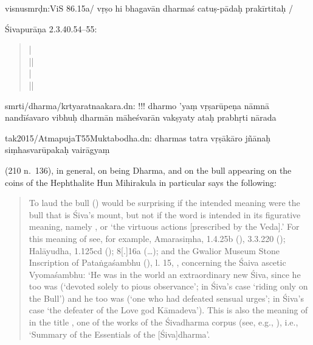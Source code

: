 \documentclass[11pt]{book}
\begin{document}
visnusmrḍn:ViS 86.15a/ vṛṣo hi bhagavān dharmaś catuṣ-pādaḥ prakīrtitaḥ
/

Śivapurāṇa 2.3.40.54--55:

\begin{quote}
 |\\
 ||\\
 |\\
 ||
\end{quote}

smrti/dharma/krtyaratnaakara.dn: !!! dharmo 'yaṃ vṛṣarūpeṇa nāmnā
nandīśavaro vibhuḥ \textbar{} dharmān māheśvarān vakṣyaty ataḥ prabhṛti
nārada\textbar{}\textbar{}

tak2015/AtmapujaT55Muktabodha.dn: dharmas tatra vṛṣākāro jñānaḥ
siṃhasvarūpakaḥ \textbar{} vairāgyaṃ


 (210 n.~136), in general,
on  being Dharma, and
on the bull appearing on the coins of the 
Hephthalite Hun Mihirakula in particular says the following: 

\begin{quote}
{\footnotesize
To laud the bull () 
would be surprising if the intended meaning were 
the bull that is Śiva's mount, but not if the word is intended in its figurative meaning, namely , 
or  `the virtuous actions [prescribed by
the Veda].' For this meaning of  see, for example,
Amarasiṃha,  
1.4.25b (),
3.3.220 (); 
Halāyudha,
 1.125cd (); 
 8[.]16a
(\dots); 
and the Gwalior Museum Stone
Inscription of Pataṅgaśambhu (), l. 15,
, 
concerning the Śaiva ascetic Vyomaśambhu: 
`He was in the
world an extraordinary new Śiva, since he too was 
(`devoted solely to pious observance'; 
in Śiva's case `riding only on the Bull') and he too was 
 (`one who had defeated sensual
urges'; in Śiva's case `the defeater of the Love god Kāmadeva'). 
This is also the meaning of  in the title \Vss,
one of the works of the Śivadharma corpus 
(see, e.g., ), i.e., 
`Summary of the Essentials of the [Śiva]dharma'. 
}
\end{quote}
\end{document}
